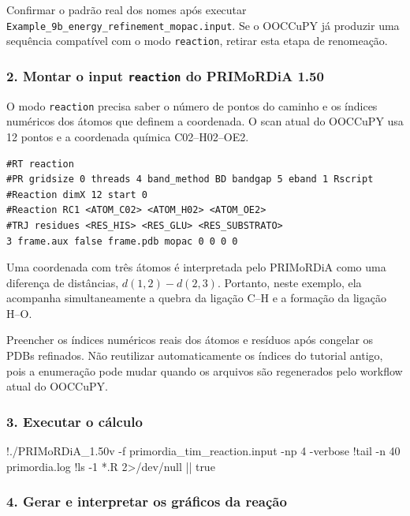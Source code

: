 \documentclass[a4paper,11pt]{refart}
\newcommand{\code}[1]{\texttt{#1}}
\begin{document}
\begin{todobox}
Confirmar o padrão real dos nomes após executar \code{Example\_9b\_energy\_refinement\_mopac.input}. Se o OOCCuPY já produzir uma sequência compatível com o modo \code{reaction}, retirar esta etapa de renomeação.
\end{todobox}

\subsubsection{2. Montar o input \texttt{reaction} do PRIMoRDiA 1.50}

O modo \code{reaction} precisa saber o número de pontos do caminho e os índices numéricos dos átomos que definem a coordenada. O scan atual do OOCCuPY usa 12 pontos e a coordenada química C02--H02--OE2.

\begin{lstlisting}[caption={Modelo de input PRIMoRDiA 1.50 para a reação da TIM},label={primordia_tim_reaction}]
#RT reaction
#PR gridsize 0 threads 4 band_method BD bandgap 5 eband 1 Rscript
#Reaction dimX 12 start 0
#Reaction RC1 <ATOM_C02> <ATOM_H02> <ATOM_OE2>
#TRJ residues <RES_HIS> <RES_GLU> <RES_SUBSTRATO>
3 frame.aux false frame.pdb mopac 0 0 0 0
\end{lstlisting}

Uma coordenada com três átomos é interpretada pelo PRIMoRDiA como uma diferença de distâncias, \(d(1,2)-d(2,3)\). Portanto, neste exemplo, ela acompanha simultaneamente a quebra da ligação C--H e a formação da ligação H--O.

\begin{todobox}
Preencher os índices numéricos reais dos átomos e resíduos após congelar os PDBs refinados. Não reutilizar automaticamente os índices do tutorial antigo, pois a enumeração pode mudar quando os arquivos são regenerados pelo workflow atual do OOCCuPY.
\end{todobox}

\subsubsection{3. Executar o cálculo}

\begin{shell}
!./PRIMoRDiA_1.50v -f primordia_tim_reaction.input -np 4 -verbose
!tail -n 40 primordia.log
!ls -1 *.R 2>/dev/null || true
\end{shell}

\subsubsection{4. Gerar e interpretar os gráficos da reação}
\end{document}
